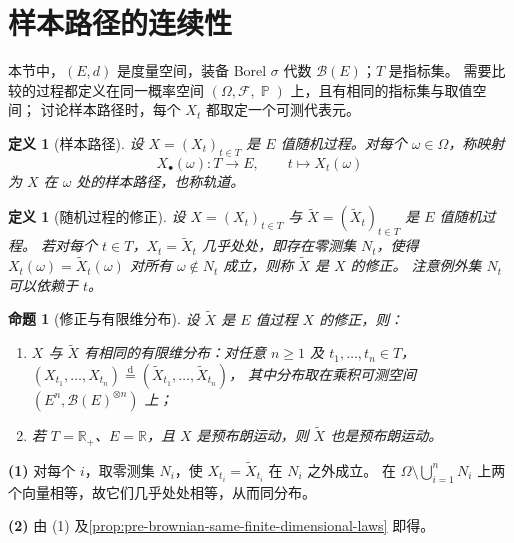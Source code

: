\documentclass[UTF8,11pt,a4paper,oneside,fontset=fandol]{ctexrep}
\makeatletter
\numberwithin{equation}{section}
\theoremstyle{zhthm}
\newtheorem{proposition}[theorem]{命题}
\newtheorem{definition}[theorem]{定义}
\renewenvironment{proof}[1][\proofname]{\par
  \pushQED{\qed}%
  \normalfont\topsep6\p@\@plus6\p@\relax
  \trivlist
  \item[\hskip\labelsep\bfseries#1\hspace{0.5em}]\ignorespaces
}{%
  \popQED\endtrivlist\@endpefalse
}
\renewcommand{\proofname}{证明}
\newcommand{\R}{\mathbb{R}}
\newcommand{\B}{\mathcal{B}}
\newcommand{\F}{\mathcal{F}}
\DeclareMathOperator{\Prob}{\mathbb{P}}
\newcommand{\deq}{\overset{\mathrm{d}}{=}}
\makeatother
\begin{document}
\section{样本路径的连续性}
\label{sec:sample-path-continuity}

本节中，$(E,d)$ 是度量空间，装备 Borel $\sigma$ 代数 $\B(E)$；$T$ 是指标集。
需要比较的过程都定义在同一概率空间 $(\Omega,\F,\Prob)$ 上，且有相同的指标集与取值空间；
讨论样本路径时，每个 $X_t$ 都取定一个可测代表元。

\begin{definition}[样本路径]
\label{def:sample-path}
设 $X=(X_t)_{t\in T}$ 是 $E$ 值随机过程。对每个 $\omega\in\Omega$，称映射
\[
  X_\bullet(\omega):T\to E,\qquad t\mapsto X_t(\omega)
\]
为 $X$ 在 $\omega$ 处的样本路径，也称轨道。
\end{definition}

\begin{definition}[随机过程的修正]
\label{def:process-modification}
设 $X=(X_t)_{t\in T}$ 与 $\widetilde X=(\widetilde X_t)_{t\in T}$ 是 $E$ 值随机过程。
若对每个 $t\in T$，$X_t=\widetilde X_t$ 几乎处处，即存在零测集 $N_t$，使得
$X_t(\omega)=\widetilde X_t(\omega)$ 对所有 $\omega\notin N_t$ 成立，则称 $\widetilde X$ 是 $X$ 的修正。
注意例外集 $N_t$ 可以依赖于 $t$。
\end{definition}

\begin{proposition}[修正与有限维分布]
\label{prop:modification-finite-dimensional-laws}
设 $\widetilde X$ 是 $E$ 值过程 $X$ 的修正，则：
\begin{enumerate}
  \item $X$ 与 $\widetilde X$ 有相同的有限维分布：对任意 $n\ge1$ 及 $t_1,\ldots,t_n\in T$，
    $(X_{t_1},\ldots,X_{t_n})\deq(\widetilde X_{t_1},\ldots,\widetilde X_{t_n})$，
    其中分布取在乘积可测空间 $(E^n,\B(E)^{\otimes n})$ 上；
  \item 若 $T=\R_+$、$E=\R$，且 $X$ 是预布朗运动，则 $\widetilde X$ 也是预布朗运动。
\end{enumerate}
\end{proposition}

\begin{proof}
\textbf{(1)} 对每个 $i$，取零测集 $N_i$，使 $X_{t_i}=\widetilde X_{t_i}$ 在 $N_i$ 之外成立。
在 $\Omega\setminus\bigcup_{i=1}^{n}N_i$ 上两个向量相等，故它们几乎处处相等，从而同分布。

\textbf{(2)} 由 (1) 及\cref{prop:pre-brownian-same-finite-dimensional-laws} 即得。
\end{proof}
\end{document}
